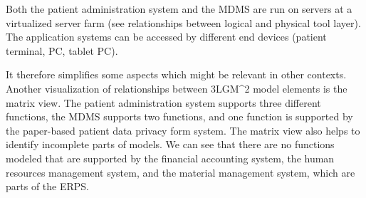 Both the patient administration system and the MDMS are run on servers at a virtualized server farm (see relationships between logical and physical tool layer). The application systems can be accessed by different end devices (patient terminal, PC, tablet PC).

It therefore simplifies some aspects which might be relevant in other contexts.
Another visualization of relationships between 3LGM^2 model elements is the matrix view.
The patient administration system supports three different functions, the MDMS supports two functions, and one function is supported by the paper-based patient data privacy form system.
The matrix view also helps to identify incomplete parts of models.
We can see that there are no functions modeled that are supported by the financial accounting system, the human resources management system, and the material management system, which are parts of the ERPS.

